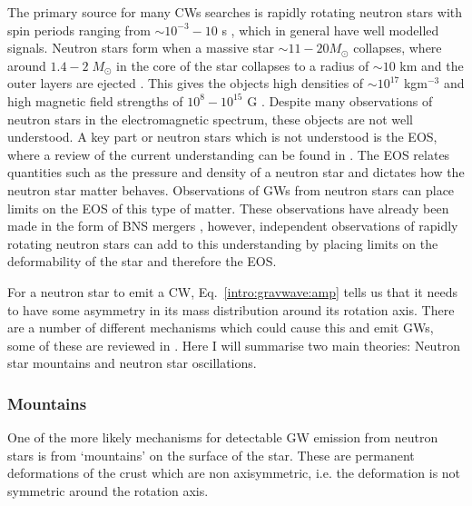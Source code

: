 The primary source for many \glspl{CW} searches is rapidly rotating neutron
stars with spin periods ranging from $\sim 10^{-3} - 10$ s
\citep{manchester2005AustraliaTelescope}, which in general have well modelled signals.  Neutron stars form when a
massive star $\sim 11 - 20 M_{\odot}$ collapses, where around $1.4-2 \;
M_{\odot}$ \citep{}  in the core of the star collapses to a radius of $\sim 10$ km and the outer layers are ejected \citep{} . 
This gives the objects high densities of $\sim 10^{17}$ kgm$^{-3}$ and high magnetic field strengths of $10^8 - 10^{15}$ G \citep{konar2017MagneticFields}.  
Despite many observations of neutron stars in the electromagnetic spectrum,
these objects are not well understood.  A key part or neutron stars which is
not understood is the \gls{EOS}, where a review of the current understanding can be
found in \cite{lattimer2016EquationState}.  The \gls{EOS} relates quantities
such as the pressure and density of a neutron star and dictates how the neutron
star matter behaves. Observations of \glspl{GW} from neutron stars can place
limits on the \gls{EOS} of this type of matter.  These observations have
already been made in the form of \gls{BNS} mergers
\citep{abbott2017GW170817Observation}, however, independent observations of
rapidly rotating neutron stars can add to this understanding by placing limits
on the deformability of the star and therefore the \gls{EOS}.

For a neutron star to emit a \gls{CW}, Eq.~\ref{intro:gravwave:amp} tells us that it needs to have some asymmetry in its mass distribution around its rotation axis.  There are a number of different mechanisms which
could cause this and emit \glspl{GW}, some of these are reviewed in
\citep{glampedakis2017GravitationalWaves,riles2017RecentSearches,haskell2015DetectingGravitational,lasky2015GravitationalWaves}.
Here I will summarise two main theories: Neutron star mountains and neutron
star oscillations.

\subsubsection{\label{intro:source:cw:mountain}Mountains}

One of the more likely mechanisms for detectable \gls{GW} emission from neutron
stars is from `mountains' on the surface of the star.  These are permanent
deformations of the crust which are non axisymmetric, i.e. the deformation is
not symmetric around the rotation axis.

